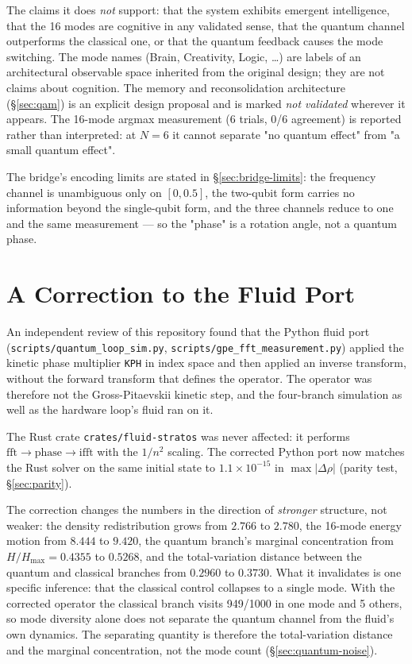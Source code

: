 \documentclass[sigconf,anonymous=false]{acmart}
\begin{document}
The claims it does \emph{not} support: that the system exhibits emergent intelligence, that the
16 modes are cognitive in any validated sense, that the quantum channel outperforms the
classical one, or that the quantum feedback causes the mode switching. The mode names (Brain,
Creativity, Logic, \dots) are labels of an architectural observable space inherited from the
original design; they are not claims about cognition. The memory and reconsolidation
architecture (\S\ref{sec:qam}) is an explicit design proposal and is marked \emph{not
validated} wherever it appears. The 16-mode argmax measurement (6 trials, 0/6 agreement) is
reported rather than interpreted: at $N=6$ it cannot separate "no quantum effect" from "a
small quantum effect".

The bridge's encoding limits are stated in \S\ref{sec:bridge-limits}: the frequency channel is
unambiguous only on $[0,0.5]$, the two-qubit form carries no information beyond the
single-qubit form, and the three channels reduce to one and the same measurement --- so the
"phase" is a rotation angle, not a quantum phase.

\section{A Correction to the Fluid Port}

\label{sec:correction}

An independent review of this repository found that the Python fluid port
(\texttt{scripts/quantum\_loop\_sim.py}, \texttt{scripts/gpe\_fft\_measurement.py}) applied the
kinetic phase multiplier \texttt{KPH} in index space and then applied an inverse transform, without
the forward transform that defines the operator. The operator was therefore not the Gross-Pitaevskii
kinetic step, and the four-branch simulation as well as the hardware loop's fluid ran on it.

The Rust crate \texttt{crates/fluid-stratos} was never affected: it performs
$\text{fft} \to \text{phase} \to \text{ifft}$ with the $1/n^2$ scaling. The corrected Python port
now matches the Rust solver on the same initial state to $1.1\times 10^{-15}$ in
$\max|\Delta\rho|$ (parity test, \S\ref{sec:parity}).

The correction changes the numbers in the direction of \emph{stronger} structure, not weaker:
the density redistribution grows from $2.766$ to $2.780$, the 16-mode energy motion from $8.444$
to $9.420$, the quantum branch's marginal concentration from $H/H_{\max}=0.4355$ to $0.5268$, and
the total-variation distance between the quantum and classical branches from $0.2960$ to $0.3730$.
What it invalidates is one specific inference: that the classical control collapses to a single
mode. With the corrected operator the classical branch visits 949/1000 in one mode and 5 others,
so mode diversity alone does not separate the quantum channel from the fluid's own dynamics.
The separating quantity is therefore the total-variation distance and the marginal concentration,
not the mode count (\S\ref{sec:quantum-noise}).
\end{document}
